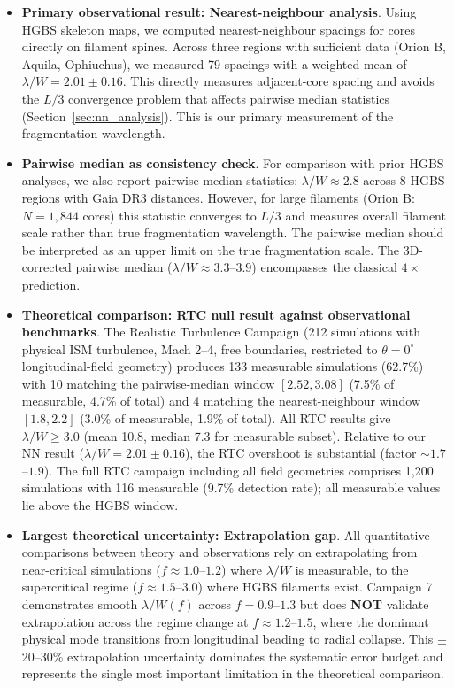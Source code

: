\documentclass[twocolumn,usenatbib]{mnras}
\begin{document}
\begin{itemize}
    \item \textbf{Primary observational result: Nearest-neighbour analysis}. Using HGBS skeleton maps, we computed nearest-neighbour spacings for cores directly on filament spines. Across three regions with sufficient data (Orion B, Aquila, Ophiuchus), we measured 79 spacings with a weighted mean of $\lambda/W = 2.01 \pm 0.16$. This directly measures adjacent-core spacing and avoids the $L/3$ convergence problem that affects pairwise median statistics (Section~\ref{sec:nn_analysis}). This is our primary measurement of the fragmentation wavelength.

    \item \textbf{Pairwise median as consistency check}. For comparison with prior HGBS analyses, we also report pairwise median statistics: $\lambda/W \approx 2.8$ across 8 HGBS regions with Gaia DR3 distances. However, for large filaments (Orion B: $N = 1,844$ cores) this statistic converges to $L/3$ and measures overall filament scale rather than true fragmentation wavelength. The pairwise median should be interpreted as an upper limit on the true fragmentation scale. The 3D-corrected pairwise median ($\lambda/W \approx 3.3$--$3.9$) encompasses the classical $4\times$ prediction.

    \item \textbf{Theoretical comparison: RTC null result against observational benchmarks}. The Realistic Turbulence Campaign (212 simulations with physical ISM turbulence, Mach 2--4, free boundaries, restricted to $\theta = 0^{\circ}$ longitudinal-field geometry) produces 133 measurable simulations (62.7\%) with 10 matching the pairwise-median window $[2.52, 3.08]$ (7.5\% of measurable, 4.7\% of total) and 4 matching the nearest-neighbour window $[1.8, 2.2]$ (3.0\% of measurable, 1.9\% of total). All RTC results give $\lambda/W \geq 3.0$ (mean 10.8, median 7.3 for measurable subset). Relative to our NN result ($\lambda/W = 2.01 \pm 0.16$), the RTC overshoot is substantial (factor $\sim 1.7$--$1.9$). The full RTC campaign including all field geometries comprises 1,200 simulations with 116 measurable (9.7\% detection rate); all measurable values lie above the HGBS window.

    \item \textbf{Largest theoretical uncertainty: Extrapolation gap}. All quantitative comparisons between theory and observations rely on extrapolating from near-critical simulations ($f \approx 1.0$--$1.2$) where $\lambda/W$ is measurable, to the supercritical regime ($f \approx 1.5$--$3.0$) where HGBS filaments exist. Campaign 7 demonstrates smooth $\lambda/W(f)$ across $f = 0.9$--$1.3$ but does \textbf{NOT} validate extrapolation across the regime change at $f \approx 1.2$--$1.5$, where the dominant physical mode transitions from longitudinal beading to radial collapse. This $\pm$20--30\% extrapolation uncertainty dominates the systematic error budget and represents the single most important limitation in the theoretical comparison.


\end{itemize}
\end{document}
